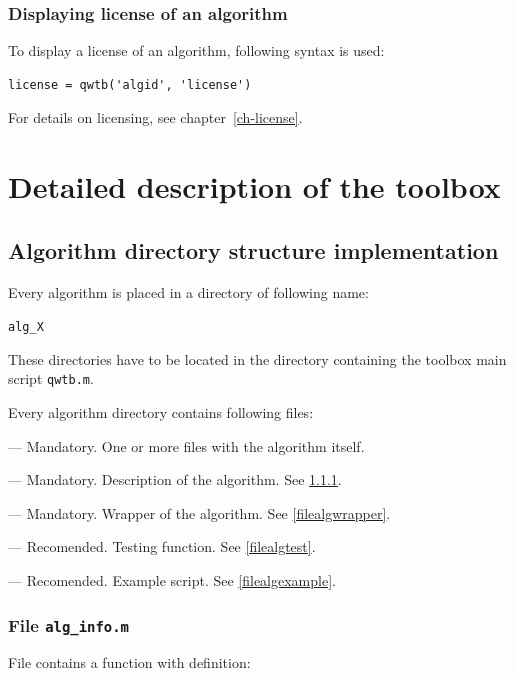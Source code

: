 \documentclass[12pt,a4paper,oneside]{report} %
\begin{document}
\subsection{Displaying license of an algorithm} %
To display a license of an algorithm, following syntax is used:
\begin{lstlisting}
license = qwtb('algid', 'license')
\end{lstlisting}
For details on licensing, see chapter~\ref{ch-license}.


\chapter{Detailed description of the toolbox} %
\section{Algorithm directory structure implementation} %
\label{diralg}
Every algorithm is placed in a directory of following name:
\begin{center}
        {\tt alg\_X}
\end{center}
These directories have to be located in the directory containing the toolbox main script {\tt qwtb.m}.

Every algorithm directory contains following files:
\begin{tightdesc}
        \item [{\tt X1}, {\tt X2}, \dots] ---  Mandatory. One or more files with the algorithm itself.
        \item [{\tt alg\_info.m}] ---  Mandatory. Description of the algorithm. See \ref{filealginfo}.
        \item [{\tt alg\_wrapper.m}] ---  Mandatory. Wrapper of the algorithm. See \ref{filealgwrapper}.
        \item [{\tt alg\_test.m}] ---  Recomended. Testing function. See \ref{filealgtest}.
        \item [{\tt alg\_example.m}] ---  Recomended. Example script. See \ref{filealgexample}.
\end{tightdesc}

\subsection{File {\tt alg\_info.m}} %
\label{filealginfo}
File contains a function with definition:
\end{document}

